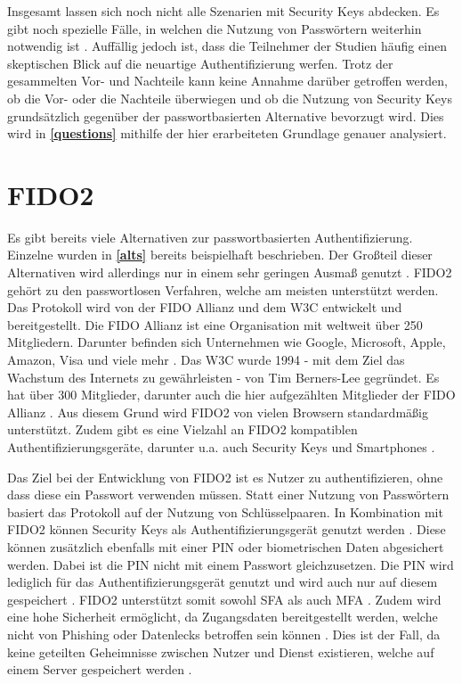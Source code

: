 Insgesamt lassen sich noch nicht alle Szenarien mit Security Keys abdecken. Es gibt noch spezielle Fälle, in welchen die Nutzung von Passwörtern weiterhin notwendig ist \cite{lyastani2020fido2}. Auffällig jedoch ist, dass die Teilnehmer der Studien häufig einen skeptischen Blick auf die neuartige Authentifizierung werfen. Trotz der gesammelten Vor- und Nachteile kann keine Annahme darüber getroffen werden, ob die Vor- oder die Nachteile überwiegen und ob die Nutzung von Security Keys grundsätzlich gegenüber der passwortbasierten Alternative bevorzugt wird. Dies wird in \textbf{\ref{questions}} mithilfe der hier erarbeiteten Grundlage genauer analysiert.

\section{FIDO2} \label{fido2}

Es gibt bereits viele Alternativen zur passwortbasierten Authentifizierung. Einzelne wurden in \textbf{\ref{alts}} bereits beispielhaft beschrieben. Der Großteil dieser Alternativen wird allerdings nur in einem sehr geringen Ausmaß genutzt \cite{farke2020you}. \ac{FIDO}2 gehört zu den passwortlosen Verfahren, welche am meisten unterstützt werden. Das Protokoll wird von der \ac{FIDO} Allianz und dem \ac{W3C} entwickelt und bereitgestellt. Die \ac{FIDO} Allianz ist eine Organisation mit weltweit über 250 Mitgliedern. Darunter befinden sich Unternehmen wie Google, Microsoft, Apple, Amazon, Visa und viele mehr  \cite{farke2020you} \cite{lyastani2020fido2}. Das \ac{W3C} wurde 1994 - mit dem Ziel das Wachstum des Internets zu gewährleisten - von Tim Berners-Lee gegründet. Es hat über 300 Mitglieder, darunter auch die hier aufgezählten Mitglieder der \ac{FIDO} Allianz \cite{w3cabout}. Aus diesem Grund wird \ac{FIDO}2 von vielen Browsern standardmäßig unterstützt. Zudem gibt es eine Vielzahl an \ac{FIDO}2 kompatiblen Authentifizierungsgeräte, darunter u.a. auch Security Keys und Smartphones \cite{lyastani2020fido2}.

Das Ziel bei der Entwicklung von \ac{FIDO}2 ist es Nutzer zu authentifizieren, ohne dass diese ein Passwort verwenden müssen. Statt einer Nutzung von Passwörtern basiert das Protokoll auf der Nutzung von Schlüsselpaaren. In Kombination mit \ac{FIDO}2 können Security Keys als Authentifizierungsgerät genutzt werden \cite{barbosa2021provable} \cite{morii2017research}. Diese können zusätzlich ebenfalls mit einer PIN oder biometrischen Daten abgesichert werden. Dabei ist die PIN nicht mit einem Passwort gleichzusetzen. Die PIN wird lediglich für das Authentifizierungsgerät genutzt und wird auch nur auf diesem gespeichert \cite{farke2020you} \cite{barbosa2021provable}. \ac{FIDO}2 unterstützt somit sowohl \ac{SFA} als auch \ac{MFA} \cite{farke2020you} \cite{lyastani2020fido2}. Zudem wird eine hohe Sicherheit ermöglicht, da Zugangsdaten bereitgestellt werden, welche nicht von Phishing oder Datenlecks betroffen sein können \cite{lyastani2020fido2}. Dies ist der Fall, da keine geteilten Geheimnisse zwischen Nutzer und Dienst existieren, welche auf einem Server gespeichert werden \cite{morii2017research}. 

